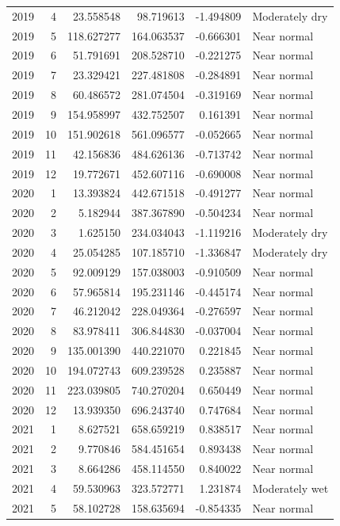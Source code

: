 \begin{tabular}{rrrrrl}
2019 & 4 & 23.558548 & 98.719613 & -1.494809 & Moderately dry \\
2019 & 5 & 118.627277 & 164.063537 & -0.666301 & Near normal \\
2019 & 6 & 51.791691 & 208.528710 & -0.221275 & Near normal \\
2019 & 7 & 23.329421 & 227.481808 & -0.284891 & Near normal \\
2019 & 8 & 60.486572 & 281.074504 & -0.319169 & Near normal \\
2019 & 9 & 154.958997 & 432.752507 & 0.161391 & Near normal \\
2019 & 10 & 151.902618 & 561.096577 & -0.052665 & Near normal \\
2019 & 11 & 42.156836 & 484.626136 & -0.713742 & Near normal \\
2019 & 12 & 19.772671 & 452.607116 & -0.690008 & Near normal \\
2020 & 1 & 13.393824 & 442.671518 & -0.491277 & Near normal \\
2020 & 2 & 5.182944 & 387.367890 & -0.504234 & Near normal \\
2020 & 3 & 1.625150 & 234.034043 & -1.119216 & Moderately dry \\
2020 & 4 & 25.054285 & 107.185710 & -1.336847 & Moderately dry \\
2020 & 5 & 92.009129 & 157.038003 & -0.910509 & Near normal \\
2020 & 6 & 57.965814 & 195.231146 & -0.445174 & Near normal \\
2020 & 7 & 46.212042 & 228.049364 & -0.276597 & Near normal \\
2020 & 8 & 83.978411 & 306.844830 & -0.037004 & Near normal \\
2020 & 9 & 135.001390 & 440.221070 & 0.221845 & Near normal \\
2020 & 10 & 194.072743 & 609.239528 & 0.235887 & Near normal \\
2020 & 11 & 223.039805 & 740.270204 & 0.650449 & Near normal \\
2020 & 12 & 13.939350 & 696.243740 & 0.747684 & Near normal \\
2021 & 1 & 8.627521 & 658.659219 & 0.838517 & Near normal \\
2021 & 2 & 9.770846 & 584.451654 & 0.893438 & Near normal \\
2021 & 3 & 8.664286 & 458.114550 & 0.840022 & Near normal \\
2021 & 4 & 59.530963 & 323.572771 & 1.231874 & Moderately wet \\
2021 & 5 & 58.102728 & 158.635694 & -0.854335 & Near normal \\

\end{tabular}
